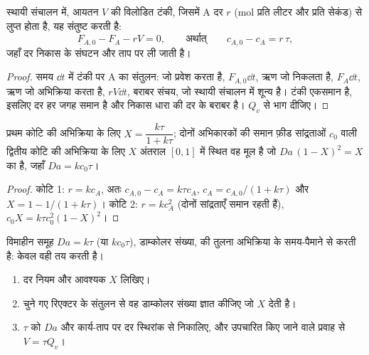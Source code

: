 \begin{proposition}[विलोडित टंकी का संतुलन]\label{prop:b2:continuous-reactors:cstr-balance}
स्थायी संचालन में, आयतन $V$ की विलोडित टंकी, जिसमें A दर $r$ (mol प्रति
लीटर और प्रति सेकंड) से लुप्त होता है, यह संतुष्ट करती है:
\[
  F_{A,0} - F_A - rV = 0, \qquad\text{अर्थात्}\qquad c_{A,0} - c_A = r\,\tau ,
\]
जहाँ दर निकास के संघटन और ताप पर ली जाती है।
\end{proposition}

\begin{proof}
समय $\dd t$ में टंकी पर A का संतुलन: जो प्रवेश करता है, $F_{A,0}\dd t$,
ऋण जो निकलता है, $F_A\dd t$, ऋण जो अभिक्रिया करता है, $rV\dd t$, बराबर
संचय, जो स्थायी संचालन में शून्य है। टंकी एकसमान है, इसलिए दर
हर जगह समान है और निकास धारा की दर के बराबर है। $Q_v$ से भाग दीजिए।
\end{proof}

\begin{theorem}[विलोडित टंकी में रूपांतरण]\label{thm:b2:continuous-reactors:cstr}
प्रथम कोटि की अभिक्रिया के लिए $X = \dfrac{k\tau}{1 + k\tau}$; दोनों
अभिकारकों की समान फ़ीड सांद्रताओं $c_0$ वाली द्वितीय कोटि की अभिक्रिया के लिए
$X$ अंतराल $[0, 1]$ में स्थित वह मूल है जो $Da\,(1 - X)^2 = X$ का है, जहाँ $Da =
kc_0\tau$।
\end{theorem}

\begin{proof}
कोटि 1: $r = kc_A$, अतः $c_{A,0} - c_A = k\tau c_A$, $c_A = c_{A,0}/(1 + k\tau)$
और $X = 1 - 1/(1 + k\tau)$। कोटि 2: $r = kc_A^2$ (दोनों सांद्रताएँ
समान रहती हैं), $c_0X = k\tau c_0^2(1 - X)^2$।
\end{proof}

विमाहीन समूह $Da = k\tau$ (या $kc_0\tau$), डाम्कोलर
संख्या,  की तुलना अभिक्रिया के समय-पैमाने से करती है:
केवल वही  तय करती है।

\begin{method}[रिएक्टर का आकार तय करना]\label{met:b2:continuous-reactors:size-reactor}
\begin{enumerate}
  \item दर नियम और आवश्यक  $X$ लिखिए।
  \item चुने गए रिएक्टर के संतुलन से वह डाम्कोलर संख्या ज्ञात कीजिए
        जो $X$ देती है।
  \item $\tau$ को $Da$ और कार्य-ताप पर दर स्थिरांक से निकालिए,
        और उपचारित किए जाने वाले प्रवाह से $V = \tau Q_v$।
\end{enumerate}
\end{method}


